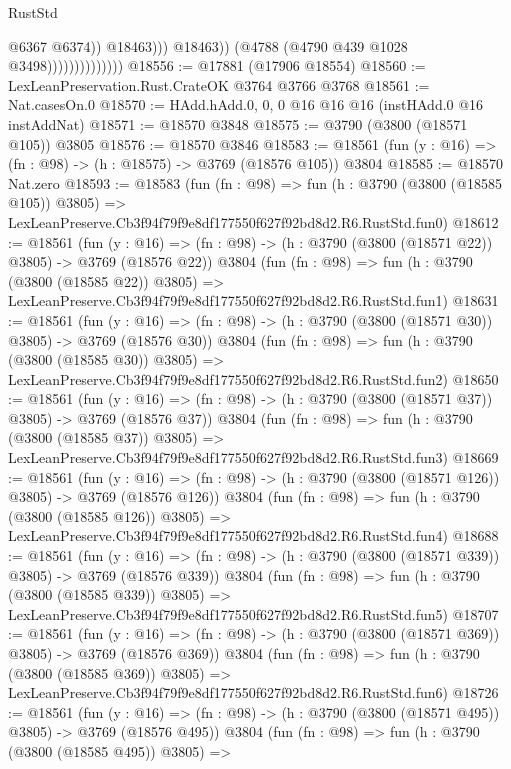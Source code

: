 \begin{lexlean}{RustStd}
\begin{coremodule}
                                          @6367
                                          @6374))
                                      @18463)))
                                @18463))
                            (@4788 (@4790 @439 @1028 @3498))))))))))))))
@18556 := @17881 (@17906 @18554)
@18560 := LexLeanPreservation.Rust.CrateOK @3764 @3766 @3768
@18561 := Nat.casesOn.{0}
@18570 := HAdd.hAdd.{0, 0, 0} @16 @16 @16 (instHAdd.{0} @16 instAddNat)
@18571 := @18570 @3848
@18575 := @3790 (@3800 (@18571 @105)) @3805
@18576 := @18570 @3846
@18583 := @18561 (fun (y : @16) => (fn : @98) -> (h : @18575) -> @3769 (@18576 @105)) @3804
@18585 := @18570 Nat.zero
@18593 := @18583
    (fun (fn : @98) =>
    fun (h : @3790 (@3800 (@18585 @105)) @3805) =>
    LexLeanPreserve.Cb3f94f79f9e8df177550f627f92bd8d2.R6.RustStd.fun0)
@18612 := @18561
    (fun (y : @16) => (fn : @98) -> (h : @3790 (@3800 (@18571 @22)) @3805) -> @3769 (@18576 @22))
    @3804
    (fun (fn : @98) =>
    fun (h : @3790 (@3800 (@18585 @22)) @3805) =>
    LexLeanPreserve.Cb3f94f79f9e8df177550f627f92bd8d2.R6.RustStd.fun1)
@18631 := @18561
    (fun (y : @16) => (fn : @98) -> (h : @3790 (@3800 (@18571 @30)) @3805) -> @3769 (@18576 @30))
    @3804
    (fun (fn : @98) =>
    fun (h : @3790 (@3800 (@18585 @30)) @3805) =>
    LexLeanPreserve.Cb3f94f79f9e8df177550f627f92bd8d2.R6.RustStd.fun2)
@18650 := @18561
    (fun (y : @16) => (fn : @98) -> (h : @3790 (@3800 (@18571 @37)) @3805) -> @3769 (@18576 @37))
    @3804
    (fun (fn : @98) =>
    fun (h : @3790 (@3800 (@18585 @37)) @3805) =>
    LexLeanPreserve.Cb3f94f79f9e8df177550f627f92bd8d2.R6.RustStd.fun3)
@18669 := @18561
    (fun (y : @16) => (fn : @98) -> (h : @3790 (@3800 (@18571 @126)) @3805) -> @3769 (@18576 @126))
    @3804
    (fun (fn : @98) =>
    fun (h : @3790 (@3800 (@18585 @126)) @3805) =>
    LexLeanPreserve.Cb3f94f79f9e8df177550f627f92bd8d2.R6.RustStd.fun4)
@18688 := @18561
    (fun (y : @16) => (fn : @98) -> (h : @3790 (@3800 (@18571 @339)) @3805) -> @3769 (@18576 @339))
    @3804
    (fun (fn : @98) =>
    fun (h : @3790 (@3800 (@18585 @339)) @3805) =>
    LexLeanPreserve.Cb3f94f79f9e8df177550f627f92bd8d2.R6.RustStd.fun5)
@18707 := @18561
    (fun (y : @16) => (fn : @98) -> (h : @3790 (@3800 (@18571 @369)) @3805) -> @3769 (@18576 @369))
    @3804
    (fun (fn : @98) =>
    fun (h : @3790 (@3800 (@18585 @369)) @3805) =>
    LexLeanPreserve.Cb3f94f79f9e8df177550f627f92bd8d2.R6.RustStd.fun6)
@18726 := @18561
    (fun (y : @16) => (fn : @98) -> (h : @3790 (@3800 (@18571 @495)) @3805) -> @3769 (@18576 @495))
    @3804
    (fun (fn : @98) =>
    fun (h : @3790 (@3800 (@18585 @495)) @3805) =>

\end{coremodule}
\end{lexlean}

